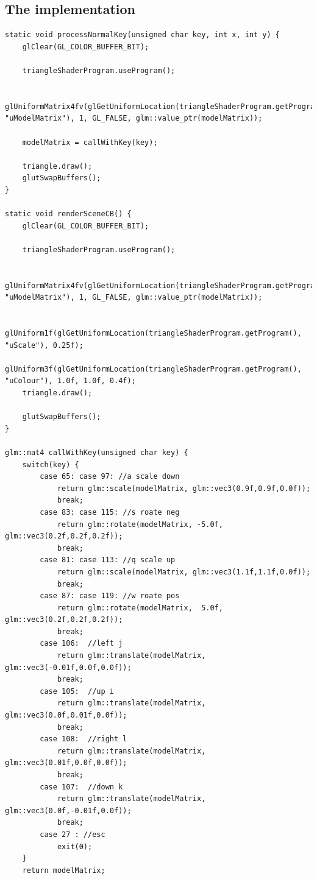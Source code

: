 \documentclass{article}
\begin{document}
\subsection{The implementation}
\begin{verbatim}
static void processNormalKey(unsigned char key, int x, int y) {
    glClear(GL_COLOR_BUFFER_BIT);

	triangleShaderProgram.useProgram();

	glUniformMatrix4fv(glGetUniformLocation(triangleShaderProgram.getProgram(), "uModelMatrix"), 1, GL_FALSE, glm::value_ptr(modelMatrix));

    modelMatrix = callWithKey(key);

	triangle.draw();
    glutSwapBuffers();
}

static void renderSceneCB() {
    glClear(GL_COLOR_BUFFER_BIT);

	triangleShaderProgram.useProgram();

	glUniformMatrix4fv(glGetUniformLocation(triangleShaderProgram.getProgram(), "uModelMatrix"), 1, GL_FALSE, glm::value_ptr(modelMatrix));

	glUniform1f(glGetUniformLocation(triangleShaderProgram.getProgram(), "uScale"), 0.25f);
	glUniform3f(glGetUniformLocation(triangleShaderProgram.getProgram(), "uColour"), 1.0f, 1.0f, 0.4f);
	triangle.draw();

    glutSwapBuffers();
}

glm::mat4 callWithKey(unsigned char key) {
    switch(key) {
        case 65: case 97: //a scale down 
            return glm::scale(modelMatrix, glm::vec3(0.9f,0.9f,0.0f));
            break;
        case 83: case 115: //s roate neg 
            return glm::rotate(modelMatrix, -5.0f, glm::vec3(0.2f,0.2f,0.2f));
            break;
        case 81: case 113: //q scale up
            return glm::scale(modelMatrix, glm::vec3(1.1f,1.1f,0.0f));
            break;
        case 87: case 119: //w roate pos
            return glm::rotate(modelMatrix,  5.0f, glm::vec3(0.2f,0.2f,0.2f));
            break;
        case 106:  //left j
            return glm::translate(modelMatrix, glm::vec3(-0.01f,0.0f,0.0f));
            break;
        case 105:  //up i
            return glm::translate(modelMatrix, glm::vec3(0.0f,0.01f,0.0f));
            break;
        case 108:  //right l
            return glm::translate(modelMatrix, glm::vec3(0.01f,0.0f,0.0f));
            break;
        case 107:  //down k
            return glm::translate(modelMatrix, glm::vec3(0.0f,-0.01f,0.0f));
            break;
        case 27 : //esc
            exit(0);
    }
    return modelMatrix;
\end{verbatim}
\newpage
\end{document}
